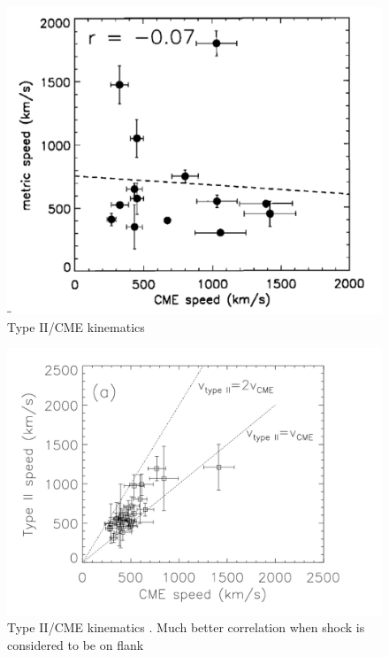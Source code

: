 \begin{figure}[t!]
\begin{center}
\includegraphics[trim=1cm 0cm 0cm 0cm, scale=0.4]{images/reiner2001.pdf}
\caption{Type II/CME kinematics \citet{reiner2001}}
\end{center}
\label{fig:reiner}
\end{figure}
\begin{figure}[b!]
\begin{center}
\includegraphics[scale=0.3]{images/mancuso_kins04.pdf}
\caption{Type II/CME kinematics \citep{mancuso2004}. Much better correlation when shock is considered to be on flank}
\end{center}
\label{fig:reiner}
\end{figure}


